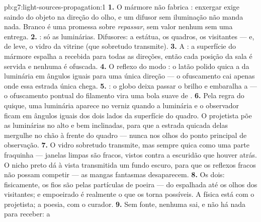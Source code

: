 \begin{solution}{pb:g7:light-sources-propagation:1}
\textbf{1.} O mármore não fabrica : enxergar exige  saindo do
objeto na direção do olho, e um difusor sem iluminação não manda
nada. Branco é uma promessa sobre \emph{repassar}, sem valor nenhum
sem uma entrega.
\textbf{2.} : só as luminárias. Difusores: a estátua,
os quadros, os visitantes --- e, de leve, o vidro da vitrine (que
sobretudo transmite).
\textbf{3.} A : a superfície do mármore espalha a  recebida
para todas as direções, então cada posição da sala é servida e
nenhuma é ofuscada.
\textbf{4.} O reflexo do modo : o latão polido quica a  da
luminária em ângulos iguais para uma única direção --- o ofuscamento
cai apenas onde essa estrada única chega.
\textbf{5.} : o globo deixa passar o brilho e embaralha a
 --- o ofuscamento pontual do filamento vira uma bola suave de
.
\textbf{6.} Pela regra do quique, uma luminária aparece no verniz
quando a luminária e o observador ficam em ângulos iguais dos dois
lados da superfície do quadro. O projetista põe as luminárias no alto
e bem inclinadas, para que a estrada quicada delas mergulhe no chão à
frente do quadro --- nunca nos olhos do ponto principal de
observação.
\textbf{7.} O vidro sobretudo transmite, mas sempre quica como
 uma parte fraquinha --- janelas limpas são  fracos,
vistos contra a escuridão que houver atrás. O nicho preto dá à vista
transmitida um fundo escuro, para que os reflexos fracos não possam
competir --- as mangas fantasmas desaparecem.
\textbf{8.} Os dois: fisicamente, os fios são  pelas
partículas de poeira ---  do  espalhada até os olhos dos
visitantes; e  empoeirado é realmente o que os torna possíveis. A
física está com o projetista; a poesia, com o curador.
\textbf{9.} Sem fonte, nenhuma  sai, e não há nada para receber: a

\end{solution}

